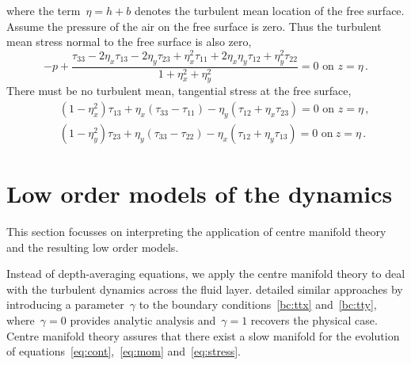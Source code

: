 \documentclass[12pt,a5paper]{article}
\begin{document}
where the term~$\eta=h+b$ denotes the turbulent mean location of the free surface. Assume the pressure of the air on the free surface is zero. Thus the turbulent mean stress normal to the free surface is also zero,
\begin{equation}
    -p+\frac{\tau_{33} -2\eta_x\tau_{13} -2\eta_y\tau_{23}
    +\eta_x^2\tau_{11} +2\eta_x\eta_y\tau_{12}+\eta_y^2\tau_{22}}
    {1+\eta_x^2+\eta_y^2}
     =0  \text{ on }
    z=\eta\,.
    \label{bc:ttz}
\end{equation}
There must be no turbulent mean, tangential stress at the free surface,
\begin{eqnarray}&&
    (1-\eta_x^2)\tau_{13}+\eta_x(\tau_{33}-\tau_{11})-\eta_y(\tau_{12}+\eta_x\tau_{23})=0
   \text{ on } z=\eta\,,
    \label{bc:ttx} \\&&
    (1-\eta_y^2)\tau_{23}+\eta_y(\tau_{33}-\tau_{22})
    -\eta_x(\tau_{12}+\eta_y\tau_{13})=0
   \text{ on}\ z=\eta\,.
    \label{bc:tty}
\end{eqnarray}




\section{Low order models of the dynamics}
\label{low-order}

This section focusses on interpreting the application of centre manifold theory and the resulting low order models.

Instead of depth-averaging equations, we apply the centre manifold theory to deal with the turbulent dynamics across the fluid layer. \cite{Roberts2008,Georgiev2008} detailed similar approaches by introducing a parameter~$\gamma$ to the boundary conditions~\eqref{bc:ttx} and~\eqref{bc:tty}, where~$\gamma=0$ provides analytic analysis and~$\gamma=1$ recovers the physical case. Centre manifold theory assures that there exist a slow manifold for the evolution of equations~\eqref{eq:cont},~\eqref{eq:mom} and~\eqref{eq:stress}.
 
\end{document}
